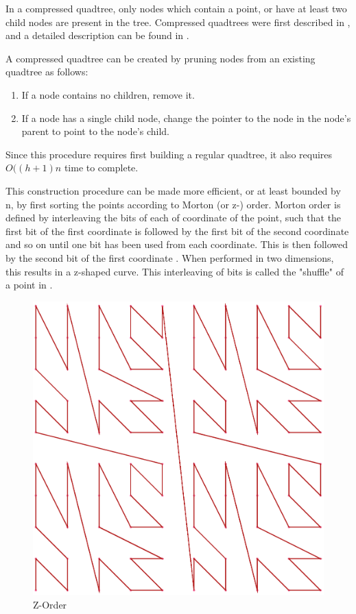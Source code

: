 \documentclass[mcs]{scsthesis}
\begin{document}
In a compressed quadtree, only nodes which contain a point, or have at least
two child nodes are present in the tree. Compressed quadtrees were first
described in \cite{compressedquadtree}, and a detailed description can be found
in \cite{skipquadtree}.

A compressed quadtree can be created by pruning nodes from an existing quadtree
as follows:

\begin{enumerate}
\item If a node contains no children, remove it.
\item If a node has a single child node, change the pointer to the node in the
node's parent to point to the node's child.
\end{enumerate}

Since this procedure requires first building a regular quadtree, it also
requires \(O((h + 1)n\) time to complete.

This construction procedure can be made more efficient, or at least bounded by
n, by first sorting the points according to Morton (or z-) order. Morton order
is defined by interleaving the bits of each of coordinate of the point, such
that the first bit of the first coordinate is followed by the first bit of the
second coordinate and so on until one bit has been used from each coordinate.
This is then followed by the second bit of the first coordinate \cite{morton}.
When performed in two dimensions, this results in a z-shaped curve. This
interleaving of bits is called the "shuffle" of a point in \cite{bern}.

\begin{figure}
\begin{center}
\includegraphics[scale=0.4]{diagrams/zorder.eps}
\caption{Z-Order}
\end{center}
\end{figure}
\end{document}
